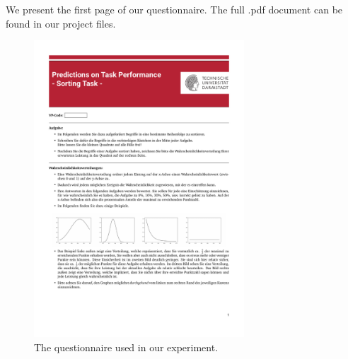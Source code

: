 \documentclass[../main/main.tex]{subfiles}
\begin{document}
	We present the first page of our questionnaire. The full .pdf document can be found in our project files.
	\begin{figure}[H]
		\centering
		\captionsetup{justification=centering}
		\includegraphics[width=0.7\textwidth]{../assets/sorting-questionnaire.pdf}
		\caption{The questionnaire used in our experiment.} 
		\label{fig:questionnaire}
	\end{figure}
\end{document}

